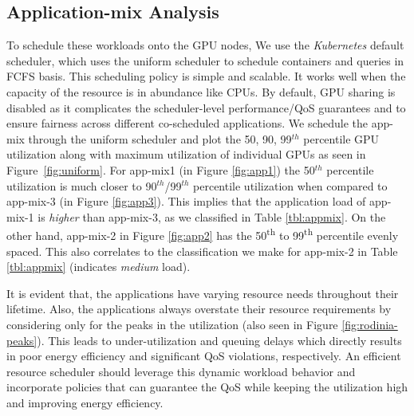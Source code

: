 \subsection{Application-mix Analysis}
To schedule these workloads onto the GPU nodes, We use the \textit{Kubernetes} default scheduler, which uses the uniform scheduler to schedule containers and queries in FCFS basis. This scheduling policy is simple and scalable. It works well when the capacity of the resource is in abundance like CPUs. By default, GPU sharing is disabled as it complicates the scheduler-level performance/QoS guarantees and to ensure fairness across different co-scheduled applications. We schedule the app-mix through the uniform scheduler and plot the 50, 90, 99$^{th}$ percentile GPU utilization along with maximum utilization of individual GPUs as seen in Figure~\ref{fig:uniform}. For app-mix1 (in Figure \ref{fig:app1}) the 50$^{th}$ percentile utilization is much closer to 90$^{th}$/99$^{th}$ percentile utilization when compared to app-mix-3 (in Figure \ref{fig:app3}). This implies that the application load of app-mix-1 is \textit{higher} than app-mix-3, as we classified in Table \ref{tbl:appmix}. On the other hand, app-mix-2 in Figure \ref{fig:app2} has the 50\textsuperscript{th} to 99\textsuperscript{th} percentile evenly spaced. This also correlates to the classification we make for app-mix-2 in Table \ref{tbl:appmix} (indicates \textit{medium} load). %

It is evident that, the applications have varying resource needs throughout their lifetime. Also, the applications always overstate their resource requirements by considering only for the peaks in the utilization  (also seen in Figure \ref{fig:rodinia-peaks}). This leads to under-utilization and queuing delays which directly results in poor energy efficiency and significant QoS violations, respectively. An efficient resource scheduler should leverage this dynamic workload behavior and incorporate policies that can guarantee the QoS while keeping the utilization high and improving energy efficiency. 

